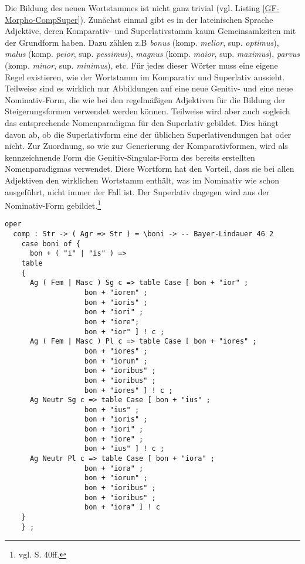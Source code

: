 Die Bildung des neuen Wortstammes ist nicht ganz trivial (vgl. Listing \ref{GF-Morpho-CompSuper}). Zunächst einmal gibt es in der lateinischen Sprache Adjektive, deren Komparativ- und Superlativstamm kaum Gemeinsamkeiten mit der Grundform haben. Dazu zählen z.B \textit{bonus} (komp. \textit{melior}, sup. \textit{optimus}), \textit{malus} (komp. \textit{peior}, sup. \textit{pessimus}), \textit{magnus} (komp. \textit{maior}, sup. \textit{maximus}), \textit{parvus} (komp. \textit{minor}, sup. \textit{minimus}), etc. Für jedes dieser Wörter muss eine eigene Regel existieren, wie der Wortstamm im Komparativ und Superlativ aussieht. Teilweise sind es wirklich nur Abbildungen auf eine neue Genitiv- und eine neue Nominativ-Form, die wie bei den regelmäßigen Adjektiven für die Bildung der Steigerungsformen verwendet werden können. Teilweise wird aber auch sogleich das entsprechende Nomenparadigma für den Superlativ gebildet. Dies hängt davon ab, ob die Superlativform eine der üblichen Superlativendungen hat oder nicht. Zur Zuordnung, so wie zur Generierung der Komparativformen, wird als kennzeichnende Form die Genitiv-Singular-Form des bereits erstellten Nomenparadigmas verwendet. Diese Wortform hat den Vorteil, dass sie bei allen Adjektiven den wirklichen Wortstamm enthält, was im Nominativ wie schon ausgeführt, nicht immer der Fall ist. Der Superlativ dagegen wird aus der Nominativ-Form gebildet.\footnote{vgl. \cite{BAYER-LINDAUER1994} S. 40ff.} \par
\begin{lstlisting}[float=h!tp,caption={Erzeugung der Komparativ-Formen eines Adjektivs (vgl. \textbf{MorphoLat.gf})},label={GF-Morpho-Comp},basicstyle=\small]
oper
  comp : Str -> ( Agr => Str ) = \boni -> -- Bayer-Lindauer 46 2
    case boni of {
      bon + ( "i" | "is" ) => 
	table
	{
	  Ag ( Fem | Masc ) Sg c => table Case [ bon + "ior" ; 
			       bon + "iorem" ; 
			       bon + "ioris" ; 
			       bon + "iori" ; 
			       bon + "iore"; 
			       bon + "ior" ] ! c ;
	  Ag ( Fem | Masc ) Pl c => table Case [ bon + "iores" ; 
			       bon + "iores" ; 
			       bon + "iorum" ; 
			       bon + "ioribus" ; 
			       bon + "ioribus" ; 
			       bon + "iores" ] ! c ;
	  Ag Neutr Sg c => table Case [ bon + "ius" ; 
			       bon + "ius" ; 
			       bon + "ioris" ; 
			       bon + "iori" ; 
			       bon + "iore" ; 
			       bon + "ius" ] ! c ;
	  Ag Neutr Pl c => table Case [ bon + "iora" ; 
			       bon + "iora" ; 
			       bon + "iorum" ; 
			       bon + "ioribus" ; 
			       bon + "ioribus" ; 
			       bon + "iora" ] ! c 
	}
    } ;
\end{lstlisting}
